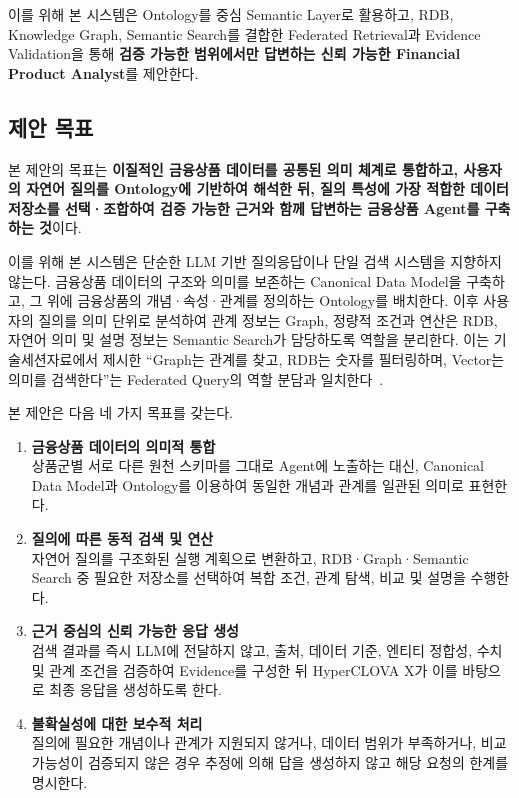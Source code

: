 \documentclass[11pt,a4paper]{article}
\begin{document}
이를 위해 본 시스템은 Ontology를 중심 Semantic Layer로 활용하고,
RDB, Knowledge Graph, Semantic Search를 결합한 Federated Retrieval과
Evidence Validation을 통해
\textbf{검증 가능한 범위에서만 답변하는 신뢰 가능한 Financial Product Analyst}를 제안한다.

\subsection{제안 목표}

본 제안의 목표는
\textbf{이질적인 금융상품 데이터를 공통된 의미 체계로 통합하고,
사용자의 자연어 질의를 Ontology에 기반하여 해석한 뒤,
질의 특성에 가장 적합한 데이터 저장소를 선택·조합하여
검증 가능한 근거와 함께 답변하는 금융상품 Agent를 구축하는 것}이다.

이를 위해 본 시스템은 단순한 LLM 기반 질의응답이나 단일 검색 시스템을 지향하지 않는다.
금융상품 데이터의 구조와 의미를 보존하는 Canonical Data Model을 구축하고,
그 위에 금융상품의 개념·속성·관계를 정의하는 Ontology를 배치한다.
이후 사용자의 질의를 의미 단위로 분석하여
관계 정보는 Graph,
정량적 조건과 연산은 RDB,
자연어 의미 및 설명 정보는 Semantic Search가 담당하도록 역할을 분리한다.
이는 기술세션자료에서 제시한
``Graph는 관계를 찾고, RDB는 숫자를 필터링하며, Vector는 의미를 검색한다''는
Federated Query의 역할 분담과 일치한다~\cite[22쪽]{mirae-tech}.

본 제안은 다음 네 가지 목표를 갖는다.

\begin{enumerate}
\item \textbf{금융상품 데이터의 의미적 통합}\\
상품군별 서로 다른 원천 스키마를 그대로 Agent에 노출하는 대신,
Canonical Data Model과 Ontology를 이용하여 동일한 개념과 관계를 일관된 의미로 표현한다.

\item \textbf{질의에 따른 동적 검색 및 연산}\\
자연어 질의를 구조화된 실행 계획으로 변환하고,
RDB·Graph·Semantic Search 중 필요한 저장소를 선택하여
복합 조건, 관계 탐색, 비교 및 설명을 수행한다.

\item \textbf{근거 중심의 신뢰 가능한 응답 생성}\\
검색 결과를 즉시 LLM에 전달하지 않고,
출처, 데이터 기준, 엔티티 정합성, 수치 및 관계 조건을 검증하여 Evidence를 구성한 뒤
HyperCLOVA X가 이를 바탕으로 최종 응답을 생성하도록 한다.

\item \textbf{불확실성에 대한 보수적 처리}\\
질의에 필요한 개념이나 관계가 지원되지 않거나,
데이터 범위가 부족하거나,
비교 가능성이 검증되지 않은 경우
추정에 의해 답을 생성하지 않고 해당 요청의 한계를 명시한다.
\end{enumerate}
\end{document}
